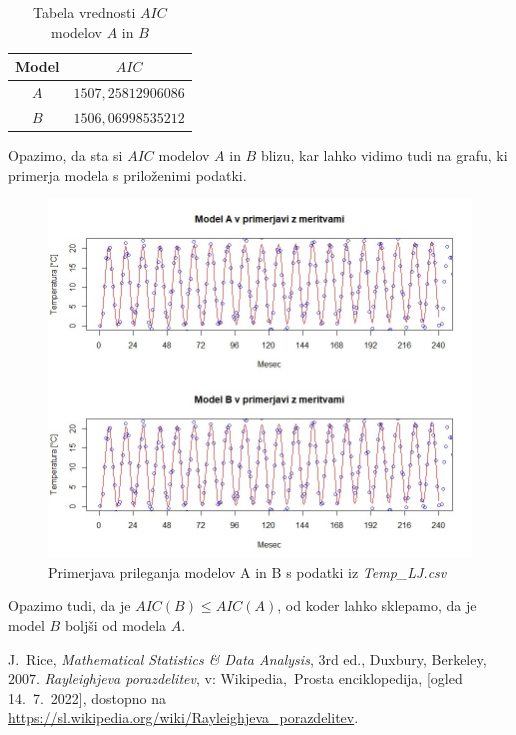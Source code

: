 \documentclass[a4paper, 10pt]{article}
\begin{document}
	\begin{table}[h!]
		\centering
		\begin{tabular}{| c | c |}
			\hline
			Model & $AIC$ \\ \hline
			$A$ & $1507{,}25812906086$ \\ \hline
			$B$ & $1506{,}06998535212$ \\ \hline
		\end{tabular}
		\caption{Tabela vrednosti $AIC$ modelov $A$ in $B$}
	\end{table}
	
	Opazimo, da sta si $AIC$ modelov $A$ in $B$ blizu, kar lahko vidimo tudi na grafu, ki primerja modela s priloženimi podatki. 
	
	\begin{figure}[h!]
		\label{fig: 3BCompare}
		\centering
		\includegraphics[scale=0.4]{PrimerjavaModelov}
		\caption{Primerjava prileganja modelov A in B s podatki iz \textit{Temp\_LJ.csv}}
	\end{figure}
	
	 Opazimo tudi, da je $AIC(B) \leq AIC(A)$, od koder lahko sklepamo, da je model $B$ boljši od modela $A$.
	
	\begin{thebibliography}{3}
		 J.~Rice, \emph{Mathematical Statistics \& Data Analysis}, 3rd ed., Duxbury, Berkeley, $2007$.
		 \emph{Rayleighjeva porazdelitev}, v: Wikipedia,~Prosta enciklopedija, [ogled 14.~7.~2022], dostopno na \url{https://sl.wikipedia.org/wiki/Rayleighjeva_porazdelitev}.
	\end{thebibliography}
\end{document}
